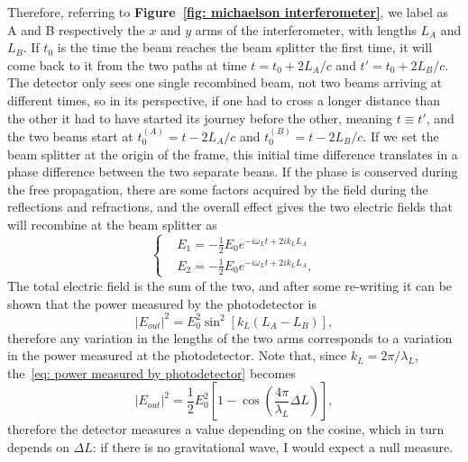 Therefore, referring to \textbf{Figure~\ref{fig: michaelson interferometer}}, we label as A and B respectively the $x$ and $y$ arms of the interferometer, with lengths $L_A$ and $L_B$.
If $t_0$ is the time the beam reaches the beam splitter the first time, it will come back to it from the two paths at time $t = t_0 + 2L_{A}/c$ and $t'= t_0 + 2L_B/c$.
The detector only sees one single recombined beam, not two beams arriving at different times, so in its perspective, if one had to cross a longer distance than the other it had to have started its journey before the other, meaning $t\equiv t'$, and the two beams start at $t_0^{(A)} = t - 2L_A/c$ and $t_0^{(B)} = t - 2L_B/c$.
If we set the beam splitter at the origin of the frame, this initial time difference translates in a phase difference between the two separate beans. 
If the phase is conserved during the free propagation, there are some factors acquired by the field during the reflections and refractions, and the overall effect gives the two electric fields that will recombine at the beam splitter as
\begin{equation}
    \left\{
        \begin{aligned}
            &E_1 = -\frac{1}{2}E_0e^{-i\omega_Lt + 2ik_LL_A} \\
            &E_2 = -\frac{1}{2}E_0e^{-i\omega_Lt + 2ik_LL_A},
        \end{aligned}
    \right.
    \label{eq: fields in arms of michaelson}
\end{equation}
The total electric field is the sum of the two, and after some re-writing it can be shown that the power measured by the photodetector is 
\begin{equation}
    |E_{out}|^2 = E_0^2 \sin^2[k_L(L_A-L_B)],
    \label{eq: power measured by photodetector}
\end{equation}
therefore any variation in the lengths of the two arms corresponds to a variation in the power measured at the photodetector.
Note that, since $k_L=2\pi/\lambda_L$, the~\eqref{eq: power measured by photodetector} becomes
\begin{equation*}
    |E_{out}|^2 = \frac{1}{2} E_0^2 \left[1-\cos{\left(\frac{4\pi}{\lambda_L}\Delta L\right)}\right],
\end{equation*}
therefore the detector measures a value depending on the cosine, which in turn depends on $\Delta L$: if there is no gravitational wave, I would expect a null measure.

